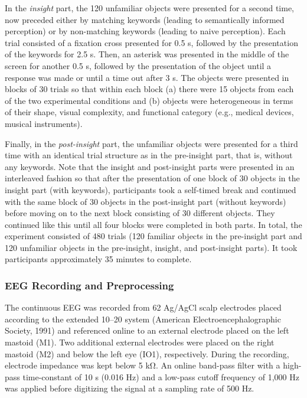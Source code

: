 \documentclass[
  english,
  doc,12pt,twoside,floatsintext]{apa7}
\begin{document}
In the \emph{insight} part, the 120 unfamiliar objects were presented for a second time, now preceded either by matching keywords (leading to semantically informed perception) or by non-matching keywords (leading to naive perception). Each trial consisted of a fixation cross presented for 0.5 s, followed by the presentation of the keywords for 2.5 s. Then, an asterisk was presented in the middle of the screen for another 0.5 s, followed by the presentation of the object until a response was made or until a time out after 3 s. The objects were presented in blocks of 30 trials so that within each block (a) there were 15 objects from each of the two experimental conditions and (b) objects were heterogeneous in terms of their shape, visual complexity, and functional category (e.g., medical devices, musical instruments).

Finally, in the \emph{post-insight} part, the unfamiliar objects were presented for a third time with an identical trial structure as in the pre-insight part, that is, without any keywords. Note that the insight and post-insight parts were presented in an interleaved fashion so that after the presentation of one block of 30 objects in the insight part (with keywords), participants took a self-timed break and continued with the same block of 30 objects in the post-insight part (without keywords) before moving on to the next block consisting of 30 different objects. They continued like this until all four blocks were completed in both parts. In total, the experiment consisted of 480 trials (120 familiar objects in the pre-insight part and 120 unfamiliar objects in the pre-insight, insight, and post-insight parts). It took participants approximately 35 minutes to complete.

\hypertarget{eeg-recording-and-preprocessing}{%
\subsubsection{EEG Recording and Preprocessing}\label{eeg-recording-and-preprocessing}}

The continuous EEG was recorded from 62 Ag/AgCl scalp electrodes placed according to the extended 10--20 system (American Electroencephalographic Society, 1991) and referenced online to an external electrode placed on the left mastoid (M1). Two additional external electrodes were placed on the right mastoid (M2) and below the left eye (IO1), respectively. During the recording, electrode impedance was kept below 5 kΩ. An online band-pass filter with a high-pass time-constant of 10 s (0.016 Hz) and a low-pass cutoff frequency of 1,000 Hz was applied before digitizing the signal at a sampling rate of 500 Hz.
\end{document}
